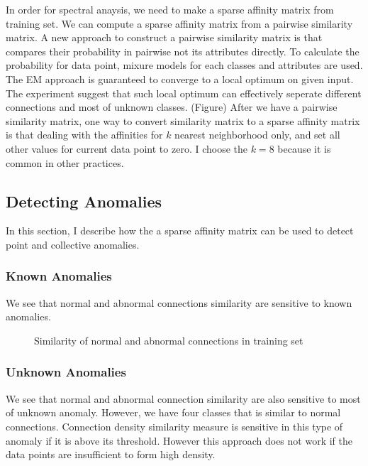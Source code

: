 In order for spectral anaysis, we need to make a sparse affinity matrix from training set. 
We can compute a sparse affinity matrix from a pairwise similarity matrix. 
A new approach to construct a pairwise similarity matrix is that compares their probability in pairwise not its attributes directly. 
To calculate the probability for data point, mixure models for each classes and attributes are used. 
The EM approach is guaranteed to converge to a local optimum on given input. 
The experiment suggest that such local optimum can effectively seperate different connections and most of unknown classes. (Figure) 
After we have a pairwise similarity matrix, one way to convert similarity matrix to a sparse affinity matrix is that dealing with the affinities for $k$ nearest neighborhood only, and set all other values for current data point to zero. 
I choose the $k = 8$ because it is common in other practices. 

\subsection{Detecting Anomalies}
\label{subsec:detectinganomalies}
In this section, I describe how the a sparse affinity matrix can be used to detect point and collective anomalies.

\subsubsection{Known Anomalies}
We see that normal and abnormal connections similarity are sensitive to known anomalies. 
\begin{figure}[htb2]
\begin{center}
\end{center}
\caption{Similarity of normal and abnormal connections in training set} %
\label{fig:refSingleRobot1}
\end{figure}

\subsubsection{Unknown Anomalies}
We see that normal and abnormal connection similarity are also sensitive to most of unknown anomaly. 
However, we have four classes that is similar to normal connections. 
Connection density similarity measure is sensitive in this type of anomaly if it is above its threshold. 
However this approach does not work if the data points are insufficient to form high density.


